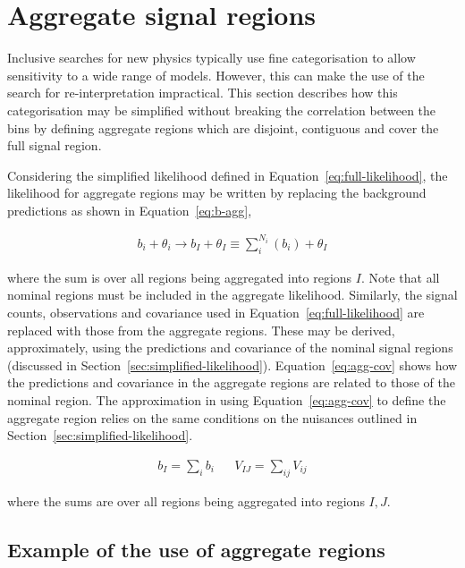 \section{Aggregate signal regions}
\label{sec:aggregate-signal-regions}

Inclusive searches for new physics typically use fine categorisation to allow
sensitivity to a wide range of models. However, this can make the use
of the search for re-interpretation impractical. 
This section describes how this categorisation may be simplified without breaking the correlation 
between the bins by defining aggregate regions which are disjoint, 
contiguous and cover the full signal region.

Considering the simplified likelihood defined in Equation~\ref{eq:full-likelihood},
the likelihood for aggregate regions may be written by replacing the 
background predictions as shown in Equation~\ref{eq:b-agg},

\begin{align}
b_{i} + \theta_i \rightarrow b_I + \theta_I \equiv \sum_{i}^{N_i}(b_{i}) + \theta_I
\label{eq:b-agg}
\end{align}

where the sum is over all regions being aggregated into regions $I$.
Note that all nominal regions must be included in the aggregate likelihood.
Similarly, the signal counts, observations and covariance used in Equation~\ref{eq:full-likelihood} are
replaced with those from the aggregate regions. These may be derived, approximately, using the predictions and covariance
of the nominal signal regions (discussed in Section~\ref{sec:simplified-likelihood}).
Equation~\ref{eq:agg-cov} shows how the predictions and covariance in the aggregate
regions are related to those of the nominal region. The approximation in using Equation~\ref{eq:agg-cov} to 
define the aggregate region relies on the same conditions 
on the nuisances outlined in Section~\ref{sec:simplified-likelihood}. 

\begin{align}
b_{I} = \sum_i b_{i} && V_{IJ}=\sum_{ij}V_{ij}
\label{eq:agg-cov}
\end{align}

where the sums are over all regions being aggregated into regions $I,J$. 

\subsection{Example of the use of aggregate regions}
\label{sec:agg-toy}


